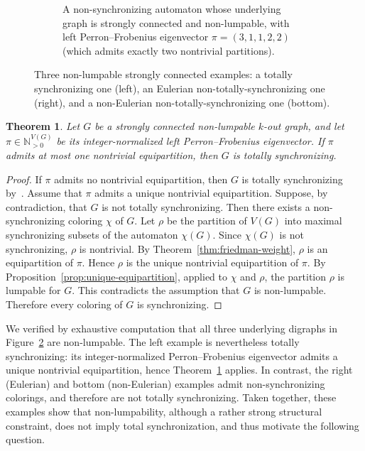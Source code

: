 \documentclass[a4paper,10pt]{amsart}
\theoremstyle{plain}
\newtheorem{theorem}{Theorem}[section]
\theoremstyle{definition}
\begin{document}
\begin{figure}[t]
\begin{subfigure}[t]{0.72\textwidth}
\caption{A non-synchronizing automaton whose underlying graph is strongly connected and non-lumpable, with
left Perron--Frobenius eigenvector $\pi=(3,1,1,2,2)$ (which admits exactly two nontrivial partitions).}
\label{fig:nonlumpable-nonEuler-nts}
\end{subfigure}

\caption{Three non-lumpable strongly connected examples: a totally synchronizing one (left), an Eulerian non-totally-synchronizing one (right), and a non-Eulerian non-totally-synchronizing one (bottom).}
\label{fig:nonlumpable-examples}
\end{figure}
\begin{theorem}\label{theo: t-s for unique partition}
Let $G$ be a strongly connected non-lumpable $k$-out graph, and let
$\pi\in\mathbb N^{V(G)}_{>0}$ be its integer-normalized left Perron--Frobenius eigenvector.
If $\pi$ admits at most one nontrivial equipartition, then $G$ is totally synchronizing.
\end{theorem}
\begin{proof}
If $\pi$ admits no nontrivial equipartition, then $G$ is totally synchronizing by~\cite[Theorem~8]{GuPri}.
Assume that $\pi$ admits a unique nontrivial equipartition.
Suppose, by contradiction, that $G$ is not totally synchronizing. Then there exists a
non-synchronizing coloring $\chi$ of $G$. Let $\rho$ be the partition of $V(G)$ into maximal
synchronizing subsets of the automaton $\chi(G)$.
Since $\chi(G)$ is not synchronizing, $\rho$ is nontrivial. By Theorem~\ref{thm:friedman-weight},
$\rho$ is an equipartition of $\pi$. Hence $\rho$ is the unique nontrivial equipartition of $\pi$.
By Proposition~\ref{prop:unique-equipartition}, applied to $\chi$ and $\rho$, the partition
$\rho$ is lumpable for $G$. This contradicts the assumption that $G$ is non-lumpable.
Therefore every coloring of $G$ is synchronizing.
\end{proof}
We verified by exhaustive computation that all three underlying digraphs in Figure~\ref{fig:nonlumpable-examples} are non-lumpable.
The left example is nevertheless totally synchronizing: its integer-normalized Perron--Frobenius eigenvector admits a unique
nontrivial equipartition, hence Theorem~\ref{theo: t-s for unique partition} applies.
In contrast, the right (Eulerian) and bottom (non-Eulerian) examples admit non-synchronizing colorings, and therefore are not totally synchronizing.
Taken together, these examples show that non-lumpability, although a rather strong structural constraint, does not imply total synchronization, and thus motivate the following question.
\end{document}
